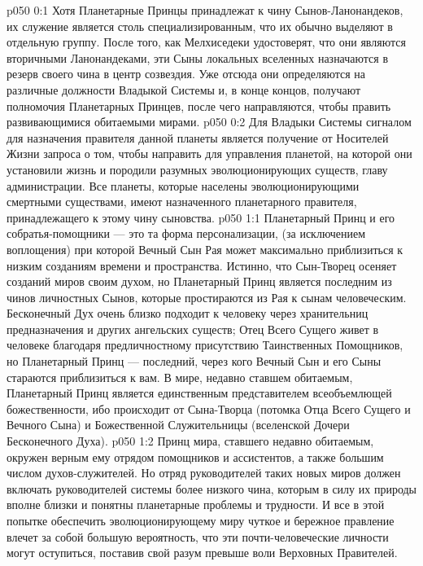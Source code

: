 \author{Вторичный Сын\hyp{}Ланонандек}
\vs p050 0:1 Хотя Планетарные Принцы принадлежат к чину Сынов\hyp{}Ланонандеков, их служение является столь специализированным, что их обычно выделяют в отдельную группу. После того, как Мелхиседеки удостоверят, что они являются вторичными Ланонандеками, эти Сыны локальных вселенных назначаются в резерв своего чина в центр созвездия. Уже отсюда они определяются на различные должности Владыкой Системы и, в конце концов, получают полномочия Планетарных Принцев, после чего направляются, чтобы править развивающимися обитаемыми мирами.
\vs p050 0:2 Для Владыки Системы сигналом для назначения правителя данной планеты является получение от Носителей Жизни запроса о том, чтобы направить для управления планетой, на которой они установили жизнь и породили разумных эволюционирующих существ, главу администрации. Все планеты, которые населены эволюционирующими смертными существами, имеют назначенного планетарного правителя, принадлежащего к этому чину сыновства.
\vs p050 1:1 Планетарный Принц и его собратья\hyp{}помощники --- это та форма персонализации, (за исключением воплощения) при которой Вечный Сын Рая может максимально приблизиться к низким созданиям времени и пространства. Истинно, что Сын\hyp{}Творец осеняет созданий миров своим духом, но Планетарный Принц является последним из чинов личностных Сынов, которые простираются из Рая к сынам человеческим. Бесконечный Дух очень близко подходит к человеку через хранительниц предназначения и других ангельских существ; Отец Всего Сущего живет в человеке благодаря предличностному присутствию Таинственных Помощников, но Планетарный Принц --- последний, через кого Вечный Сын и его Сыны стараются приблизиться к вам. В мире, недавно ставшем обитаемым, Планетарный Принц является единственным представителем всеобъемлющей божественности, ибо происходит от Сына\hyp{}Творца (потомка Отца Всего Сущего и Вечного Сына) и Божественной Служительницы (вселенской Дочери Бесконечного Духа).
\vs p050 1:2 Принц мира, ставшего недавно обитаемым, окружен верным ему отрядом помощников и ассистентов, а также большим числом духов\hyp{}служителей. Но отряд руководителей таких новых миров должен включать руководителей системы более низкого чина, которым в силу их природы вполне близки и понятны планетарные проблемы и трудности. И все в этой попытке обеспечить эволюционирующему миру чуткое и бережное правление влечет за собой большую вероятность, что эти почти\hyp{}человеческие личности могут оступиться, поставив свой разум превыше воли Верховных Правителей.
